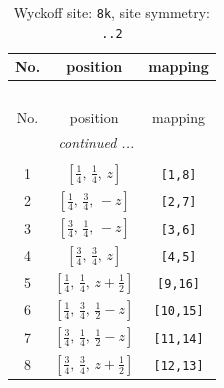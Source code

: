 \documentclass[fleqn,8pt]{jsarticle}
\begin{document}
\begin{longtable}{ccc}
\caption{Wyckoff site: {\tt 8k}, site symmetry: {\tt ..2}}
 \\
 \hline \hline
No. & position & mapping \\ \hline \endfirsthead

\multicolumn{2}{l}{\tablename\ \thetable{}} \\
 \hline \hline
No. & position & mapping \\ \hline \endhead

 \hline \hline
\multicolumn{2}{r}{\footnotesize\it continued ...} \\ \endfoot

 \hline \hline
\multicolumn{2}{r}{} \\ \endlastfoot

1 & $\left[ \frac{1}{4},\, \frac{1}{4},\, z \right]$ & {\tt [1,8]} \\ \hline
2 & $\left[ \frac{1}{4},\, \frac{3}{4},\, - z \right]$ & {\tt [2,7]} \\ \hline
3 & $\left[ \frac{3}{4},\, \frac{1}{4},\, - z \right]$ & {\tt [3,6]} \\ \hline
4 & $\left[ \frac{3}{4},\, \frac{3}{4},\, z \right]$ & {\tt [4,5]} \\ \hline
5 & $\left[ \frac{1}{4},\, \frac{1}{4},\, z + \frac{1}{2} \right]$ & {\tt [9,16]} \\ \hline
6 & $\left[ \frac{1}{4},\, \frac{3}{4},\, \frac{1}{2} - z \right]$ & {\tt [10,15]} \\ \hline
7 & $\left[ \frac{3}{4},\, \frac{1}{4},\, \frac{1}{2} - z \right]$ & {\tt [11,14]} \\ \hline
8 & $\left[ \frac{3}{4},\, \frac{3}{4},\, z + \frac{1}{2} \right]$ & {\tt [12,13]} \\
\end{longtable}
\renewcommand{\arraystretch}{1.2}
\end{document}
